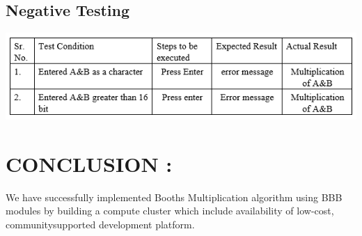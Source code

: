 \documentclass[10pt,a4paper]{article}
\begin{document}
\subsection{Negative Testing}
	\includegraphics[width=\textwidth]{booth_negative}

			
\section{CONCLUSION : }
	We have successfully implemented Booths Multiplication algorithm using BBB modules by building a compute cluster which include availability of low-cost, communitysupported development platform.  
\end{document}
